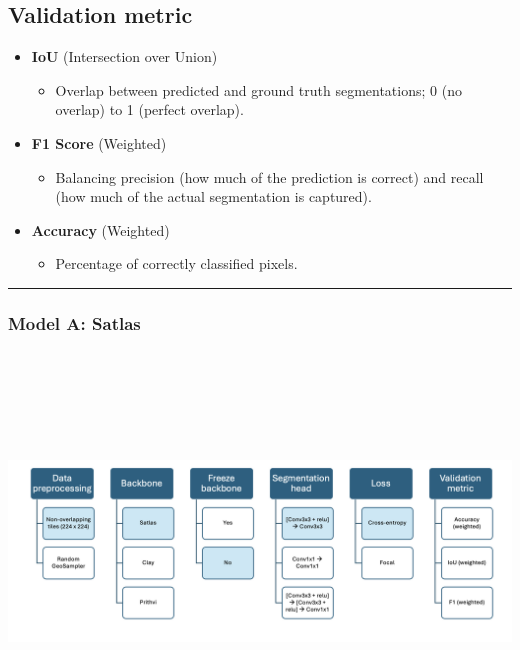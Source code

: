 \documentclass[
  letterpaper,
  DIV=11,
  numbers=noendperiod]{scrartcl}
\providecommand{\tightlist}{%
  \setlength{\itemsep}{0pt}\setlength{\parskip}{0pt}}\usepackage{longtable,booktabs,array}
\begin{document}
\subsection{Validation metric}\label{validation-metric}

\begin{itemize}
\tightlist
\item
  \textbf{IoU} (Intersection over Union)

  \begin{itemize}
  \tightlist
  \item
    Overlap between predicted and ground truth segmentations; 0 (no
    overlap) to 1 (perfect overlap).
  \end{itemize}
\item
  \textbf{F1 Score} (Weighted)

  \begin{itemize}
  \tightlist
  \item
    Balancing precision (how much of the prediction is correct) and
    recall (how much of the actual segmentation is captured).
  \end{itemize}
\item
  \textbf{Accuracy} (Weighted)

  \begin{itemize}
  \tightlist
  \item
    Percentage of correctly classified pixels.
  \end{itemize}
\end{itemize}

\begin{center}\rule{0.5\linewidth}{0.5pt}\end{center}

\subsubsection{Model A: Satlas}\label{model-a-satlas}

\begin{center}
\includegraphics[width=\textwidth,height=4.16667in]{../figures/algo_design/satlas_model.png}
\end{center}
\end{document}
